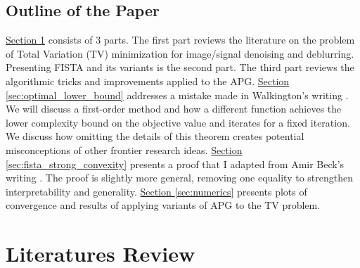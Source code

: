 \documentclass[]{article}
\theoremstyle{definition}
\numberwithin{equation}{subsection}
\begin{document}
    \subsection{Outline of the Paper}
        \hyperref[sec:Literatures]{Section \ref*{sec:Literatures}} consists of 3 parts. 
        The first part reviews the literature on the problem of Total Variation (TV) minimization for image/signal denoising and deblurring. 
        Presenting FISTA and its variants is the second part. 
        The third part reviews the algorithmic tricks and improvements applied to the APG. 
        \hyperref[sec:optimal_lower_bound]{Section \ref*{sec:optimal_lower_bound}} addresses a mistake made in Walkington's writing \cite[theorem 2.4]{noel_nesterovs_nodate}. 
        We will discuss a first-order method and how a different function achieves the lower complexity bound on the objective value and iterates for a fixed iteration. 
        We discuss how omitting the details of this theorem creates potential misconceptions of other frontier research ideas. 
        \hyperref[sec:fista_strong_convexity]{Section \ref*{sec:fista_strong_convexity}} presents a proof that I adapted from Amir Beck's writing \cite[theorem 10.7.7]{beck_first-order_nodate}. 
        The proof is slightly more general, removing one equality to strengthen interpretability and generality. 
        \hyperref[sec:numerics]{Section \ref*{sec:numerics}} presents plots of convergence and results of applying variants of APG to the TV problem. 
        

\section{Literatures Review}\label{sec:Literatures}
\end{document}

